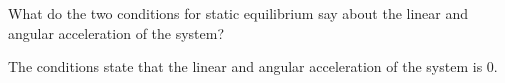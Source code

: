 What do the two conditions for static equilibrium say about the linear and angular acceleration of the system?

\begin{solution}
    The conditions state that the linear and angular acceleration of the system is 0.
\end{solution}